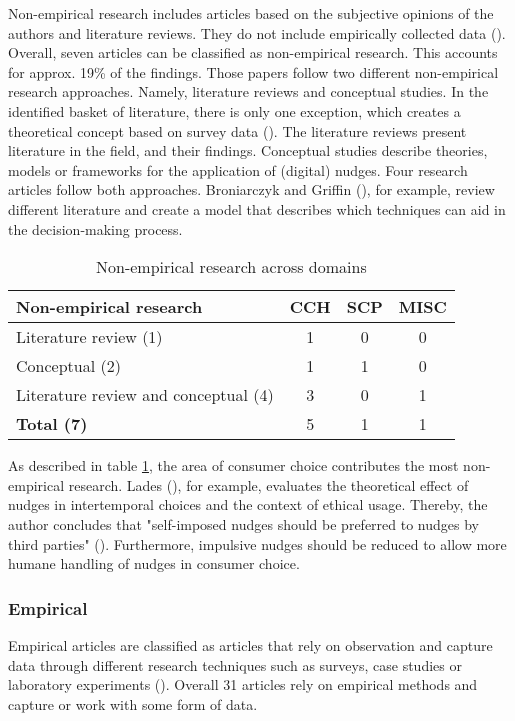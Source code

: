 Non-empirical research includes articles based on the subjective opinions of the authors and literature reviews. They do not include empirically collected data (\cite{alavi_review_1992}). Overall, seven articles can be classified as non-empirical research. This accounts for approx. 19\% of the findings. Those papers follow two different non-empirical research approaches. Namely, literature reviews and conceptual studies. In the identified basket of literature, there is only one exception,  which creates a theoretical concept based on survey data (\cite{gamliel_average_2017}). The literature reviews present literature in the field, and their findings. Conceptual studies describe theories, models or frameworks for the application of (digital) nudges. Four research articles follow both approaches. Broniarczyk and Griffin (\citeyear{broniarczyk_decision_2014}), for example, review different literature and create a model that describes which techniques can aid in the decision-making process.

\begin{table}[htbp]
\centering
\begin{tabular}{|l|ccc|}
\hline
\textbf{Non-empirical research} & \textbf{CCH} & \textbf{SCP} & \textbf{MISC} \\ \hline
Literature review (1) & 1 & 0 & 0 \\
Conceptual (2) & 1 & 1 & 0 \\
Literature review and conceptual (4) & 3 & 0 & 1 \\ \hline
\textbf{Total (7)} & 5 & 1 & 1 \\ \hline
\end{tabular}
\caption{Non-empirical research across domains}
\label{table:non-empirical}
\end{table}

As described in table \ref{table:non-empirical}, the area of consumer choice contributes the most non-empirical research. Lades (\citeyear{lades_impulsive_2014}), for example, evaluates the theoretical effect of nudges in intertemporal choices and the context of ethical usage. Thereby, the author concludes that "self-imposed nudges should be preferred to nudges by third parties" (\cite[p.122]{lades_impulsive_2014}). Furthermore, impulsive nudges should be reduced to allow more humane handling of nudges in consumer choice.

\subsubsection{Empirical}
Empirical articles are classified as articles that rely on observation and capture data through different research techniques such as surveys, case studies or laboratory experiments (\cite{alavi_review_1992}). Overall 31 articles rely on empirical methods and capture or work with some form of data.

